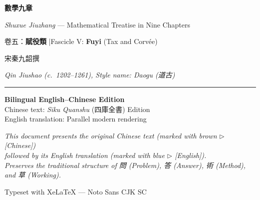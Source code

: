 \documentclass[10pt,a4paper]{article}
\begin{document}
\begin{titlepage}
\centering
\vspace*{2cm}

{\fontsize{36}{44}\selectfont\color{titlecolor}\textbf{數學九章}}

\vspace{0.8cm}

{\fontsize{16}{20}\selectfont\color{sectioncolor}\textit{Shuxue Jiuzhang} --- Mathematical Treatise in Nine Chapters}

\vspace{1.5cm}

{\Large\color{sectioncolor} 卷五：\textbf{賦役類} \quad|\quad Fascicle V: \textbf{Fuyi} (Tax and Corv\'{e}e)}

\vspace{2cm}

{\large 宋\quad 秦九韶\quad 撰}

\vspace{0.3cm}

{\normalsize\textit{Qin Jiushao (c.\ 1202--1261), Style name: Daogu (道古)}}

\vspace{1.5cm}

{\color{rulecolor}\rule{0.6\textwidth}{0.4pt}}

\vspace{1cm}

{\small\color{sectioncolor}
\textbf{Bilingual English--Chinese Edition}\\[0.5em]
Chinese text: \textit{Siku Quanshu} (四庫全書) Edition\\[0.3em]
English translation: Parallel modern rendering}

\vspace{1.5cm}

{\small\color{notecolor}
\textit{This document presents the original Chinese text (marked with brown $\triangleright$ [Chinese])\\
followed by its English translation (marked with blue $\triangleright$ [English]).\\[0.3em]
Preserves the traditional structure of 問 (Problem), 答 (Answer), 術 (Method), and 草 (Working).}}

\vfill
{\small\color{sectioncolor} Typeset with XeLaTeX --- Noto Sans CJK SC}
\end{titlepage}

\tableofcontents
\newpage

\end{document}
